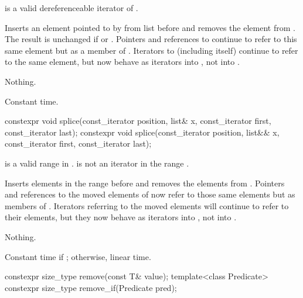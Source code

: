 \begin{itemdescr}
\pnum
\expects
{} is a valid dereferenceable iterator of .

\pnum
\effects
Inserts an element pointed to by
from list
before  and removes the element from
.
The result is unchanged if
or
.
Pointers and references to
continue to refer to this same element but as a member of
.
Iterators
to
(including
itself) continue to refer to the same element, but now behave as iterators into
,
not into
.

\pnum
\throws
Nothing.

\pnum
\complexity
Constant time.
\end{itemdescr}

%
\begin{itemdecl}
constexpr void splice(const_iterator position, list& x,
                      const_iterator first, const_iterator last);
constexpr void splice(const_iterator position, list&& x,
                      const_iterator first, const_iterator last);
\end{itemdecl}

\begin{itemdescr}
\pnum
\expects
{} is a valid range in .
 is not an iterator in the range .

\pnum
\effects
Inserts elements in the range
before
and removes the elements from
.
Pointers and references to the moved elements of
now refer to those same elements but as members of
.
Iterators referring to the moved elements will continue to refer to their
elements, but they now behave as iterators into
,
not into
.

\pnum
\throws
Nothing.

\pnum
\complexity
Constant time if
;
otherwise, linear time.
\end{itemdescr}

%
\begin{itemdecl}
constexpr size_type remove(const T& value);
template<class Predicate> constexpr size_type remove_if(Predicate pred);
\end{itemdecl}

